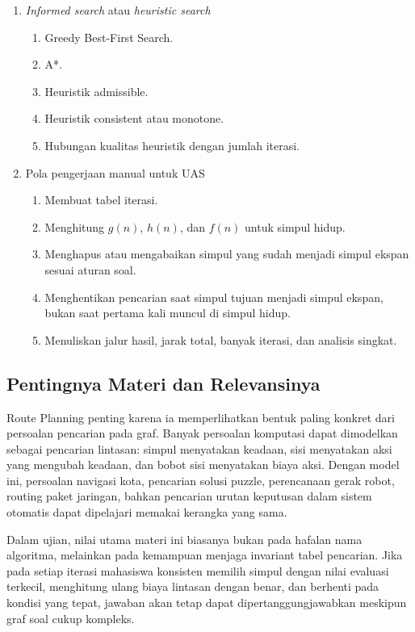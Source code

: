 \begin{enumerate}
    \item \textit{Informed search} atau \textit{heuristic search}
    \begin{enumerate}
        \item Greedy Best-First Search.
        \item A*.
        \item Heuristik admissible.
        \item Heuristik consistent atau monotone.
        \item Hubungan kualitas heuristik dengan jumlah iterasi.
    \end{enumerate}

    \item Pola pengerjaan manual untuk UAS
    \begin{enumerate}
        \item Membuat tabel iterasi.
        \item Menghitung $g(n)$, $h(n)$, dan $f(n)$ untuk simpul hidup.
        \item Menghapus atau mengabaikan simpul yang sudah menjadi simpul ekspan sesuai aturan soal.
        \item Menghentikan pencarian saat simpul tujuan menjadi simpul ekspan, bukan saat pertama kali muncul di simpul hidup.
        \item Menuliskan jalur hasil, jarak total, banyak iterasi, dan analisis singkat.
    \end{enumerate}
\end{enumerate}

\subsection{Pentingnya Materi dan Relevansinya}

Route Planning penting karena ia memperlihatkan bentuk paling konkret dari persoalan pencarian pada graf. Banyak persoalan komputasi dapat dimodelkan sebagai pencarian lintasan: simpul menyatakan keadaan, sisi menyatakan aksi yang mengubah keadaan, dan bobot sisi menyatakan biaya aksi. Dengan model ini, persoalan navigasi kota, pencarian solusi puzzle, perencanaan gerak robot, routing paket jaringan, bahkan pencarian urutan keputusan dalam sistem otomatis dapat dipelajari memakai kerangka yang sama.

Dalam ujian, nilai utama materi ini biasanya bukan pada hafalan nama algoritma, melainkan pada kemampuan menjaga invariant tabel pencarian. Jika pada setiap iterasi mahasiswa konsisten memilih simpul dengan nilai evaluasi terkecil, menghitung ulang biaya lintasan dengan benar, dan berhenti pada kondisi yang tepat, jawaban akan tetap dapat dipertanggungjawabkan meskipun graf soal cukup kompleks.

